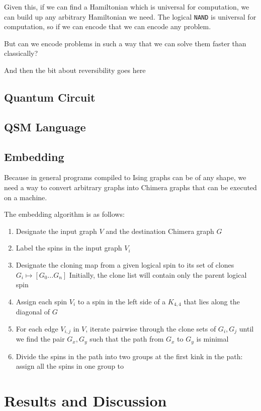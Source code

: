 \documentclass{article}
\begin{document}
Given this, if we can find a Hamiltonian which is universal for computation, we can build up any arbitrary Hamiltonian we need.  The logical
{\tt NAND} is universal for computation, so if we can encode that we can encode any problem.

But can we encode problems in such a way that we can solve them faster than classically?

And then the bit about reversibility goes here


\subsection{Quantum Circuit}


\subsection{QSM Language}

\subsection{Embedding}
Because in general programs compiled to Ising graphs can be of any shape, we need a way to convert arbitrary graphs into Chimera graphs that can be executed on a machine.

The embedding algorithm is as follows:

\begin{enumerate}
	\item Designate the input graph $V$ and the destination Chimera graph $G$
	\item Label the spins in the input graph $V_i$
	\item Designate the cloning map from a given logical spin to its set of clones $G_i \mapsto [G_0 \ldots G_n] $ Initially, the
		clone list will contain only the parent logical spin
	\item Assign each spin $V_i$ to a spin in the left side of a $K_{4,4}$ that lies along the diagonal of $G$
	\item For each edge $V_{i,j}$ in $V$, iterate pairwise through the clone sets of $G_i,G_j$ until we find the pair $G_x,G_y$ such that
		the path from $G_x$ to $G_y$ is minimal
	\item Divide the spins in the path into two groups at the first kink in the path: assign all the spins in one group to 
\end{enumerate}

\section{Results and Discussion}
\end{document}
